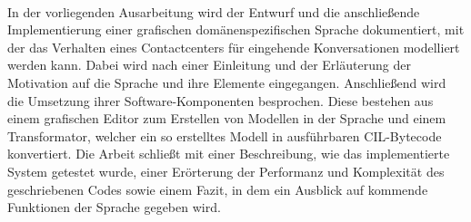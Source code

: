 \kurzfassung

\paragraph*{}
In der vorliegenden Ausarbeitung wird der Entwurf und die anschließende Implementierung einer grafischen domänenspezifischen Sprache dokumentiert, mit der das Verhalten eines Contactcenters für eingehende Konversationen modelliert werden kann. Dabei wird nach einer Einleitung und der Erläuterung der Motivation auf die Sprache und ihre Elemente eingegangen. Anschließend wird die Umsetzung ihrer Software-Komponenten besprochen. Diese bestehen aus einem grafischen Editor zum Erstellen von Modellen in der Sprache und einem Transformator, welcher ein so erstelltes Modell in ausführbaren CIL-Bytecode konvertiert. Die Arbeit schließt mit einer Beschreibung, wie das implementierte System getestet wurde, einer Erörterung der Performanz und Komplexität des geschriebenen Codes sowie einem Fazit, in dem ein Ausblick auf kommende Funktionen der Sprache gegeben wird.